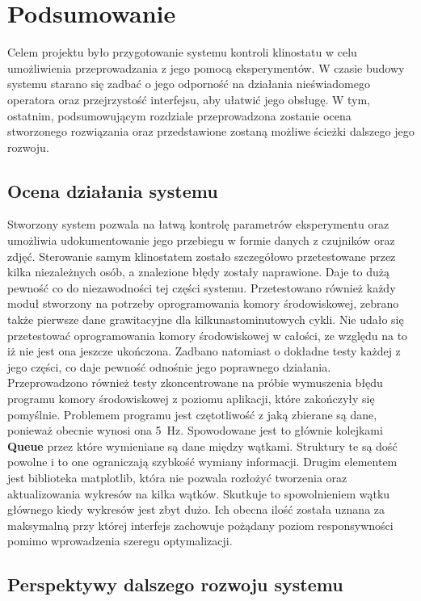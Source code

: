 \chapter{Podsumowanie}

Celem projektu było przygotowanie systemu kontroli klinostatu w celu umożliwienia przeprowadzania z jego pomocą eksperymentów. W czasie budowy systemu starano się zadbać o jego odporność na działania nieświadomego operatora oraz przejrzystość interfejsu, aby ułatwić jego obsługę. W tym, ostatnim, podsumowującym rozdziale przeprowadzona zostanie ocena stworzonego rozwiązania oraz przedstawione zostaną możliwe ścieżki dalszego jego rozwoju.


\section{Ocena działania systemu}

Stworzony system pozwala na łatwą kontrolę parametrów eksperymentu oraz umożliwia udokumentowanie jego przebiegu w formie danych z czujników oraz zdjęć. Sterowanie samym klinostatem zostało szczegółowo przetestowane przez kilka niezależnych osób, a znalezione błędy zostały naprawione. Daje to dużą pewność co do niezawodności tej części systemu. Przetestowano również każdy moduł stworzony na potrzeby oprogramowania komory środowiskowej, zebrano także pierwsze dane grawitacyjne dla kilkunastominutowych cykli. Nie udało się przetestować oprogramowania komory środowiskowej w całości, ze względu na to iż nie jest ona jeszcze ukończona. Zadbano natomiast o dokładne testy każdej z jego części, co daje pewność odnośnie jego poprawnego działania. Przeprowadzono również testy zkoncentrowane na próbie wymuszenia błędu programu komory środowiskowej z poziomu aplikacji, które zakończyły się pomyślnie. Problemem programu jest czętotliwość z jaką zbierane są dane, ponieważ obecnie wynosi ona \SI{5}{Hz}. Spowodowane jest to głównie kolejkami \textbf{Queue} przez które wymieniane są dane między wątkami. Struktury te są dość powolne i to one ograniczają szybkość wymiany informacji. Drugim elementem jest biblioteka matplotlib, która nie pozwala rozłożyć tworzenia oraz aktualizowania wykresów na kilka wątków. Skutkuje to spowolnieniem wątku głównego kiedy wykresów jest zbyt dużo. Ich obecna ilość została uznana za maksymalną przy której interfejs zachowuje pożądany poziom responsywności pomimo wprowadzenia szeregu optymalizacji.

\section{Perspektywy  dalszego rozwoju systemu}

